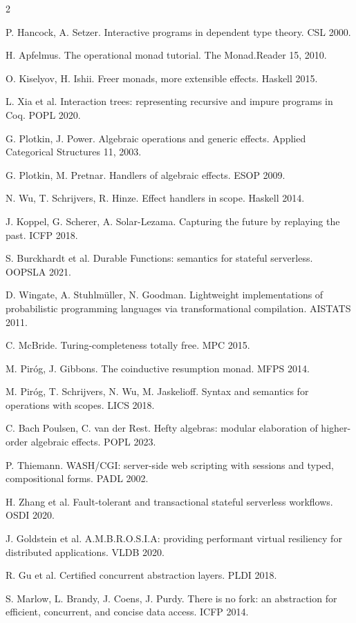 \documentclass{article}
\newcommand{\topic}[1]{\par\medskip{\bfseries\normalsize #1}\par\smallskip}
\begin{document}
\begin{multicols}{2}
\topic{Papers}
{\scriptsize\setlength{\parskip}{0.5pt}
P. Hancock, A. Setzer. Interactive programs in dependent type theory. CSL 2000.\par
H. Apfelmus. The operational monad tutorial. The Monad.Reader 15, 2010.\par
O. Kiselyov, H. Ishii. Freer monads, more extensible effects. Haskell 2015.\par
L. Xia et al. Interaction trees: representing recursive and impure programs in Coq. POPL 2020.\par
G. Plotkin, J. Power. Algebraic operations and generic effects. Applied Categorical Structures 11, 2003.\par
G. Plotkin, M. Pretnar. Handlers of algebraic effects. ESOP 2009.\par
N. Wu, T. Schrijvers, R. Hinze. Effect handlers in scope. Haskell 2014.\par
J. Koppel, G. Scherer, A. Solar-Lezama. Capturing the future by replaying the past. ICFP 2018.\par
S. Burckhardt et al. Durable Functions: semantics for stateful serverless. OOPSLA 2021.\par
D. Wingate, A. Stuhlm\"uller, N. Goodman. Lightweight implementations of probabilistic programming
languages via transformational compilation. AISTATS 2011.\par
C. McBride. Turing-completeness totally free. MPC 2015.\par
M. Pir\'og, J. Gibbons. The coinductive resumption monad. MFPS 2014.\par
M. Pir\'og, T. Schrijvers, N. Wu, M. Jaskelioff. Syntax and semantics for operations with scopes.
LICS 2018.\par
C. Bach Poulsen, C. van der Rest. Hefty algebras: modular elaboration of higher-order algebraic
effects. POPL 2023.\par
P. Thiemann. WASH/CGI: server-side web scripting with sessions and typed, compositional forms.
PADL 2002.\par
H. Zhang et al. Fault-tolerant and transactional stateful serverless workflows. OSDI 2020.\par
J. Goldstein et al. A.M.B.R.O.S.I.A: providing performant virtual resiliency for distributed
applications. VLDB 2020.\par
R. Gu et al. Certified concurrent abstraction layers. PLDI 2018.\par
S. Marlow, L. Brandy, J. Coens, J. Purdy. There is no fork: an abstraction for efficient,
concurrent, and concise data access. ICFP 2014.\par
}
\end{multicols}
\end{document}
